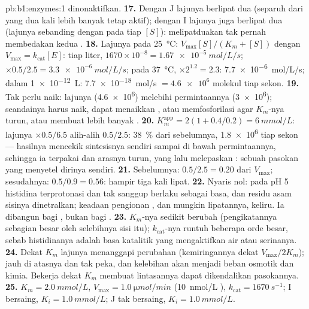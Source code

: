 \begin{solution}{pb:b1:enzymes:1}
dinonaktifkan.
\textbf{17.} Dengan J lajunya berlipat dua (separuh dari  yang dua
kali lebih banyak tetap aktif); dengan I lajunya juga berlipat dua
(lajunya sebanding dengan  pada tiap $[S]$): melipatduakan
 tak pernah membedakan kedua .
\textbf{18.} Lajunya pada \qty{25}{\celsius}: $V_{\max}[S]/(K_m + [S])$
dengan $V_{\max} = k_{\text{cat}}[E]$: tiap liter, $1670\times 10^{-8} =
\qty{1.67e-5}{mol/L/s}$; $\times 0.5/2.5 = \qty{3.3e-6}{mol/L/s}$; pada
\qty{37}{\celsius}, $\times 2^{1.2} = 2.3$: \qty{7.7e-6}{mol/L/s}; dalam
\qty{1e-12}{L}: \qty{7.7e-18}{mol/s} $= \num{4.6e6}$ molekul tiap sekon.
\textbf{19.} Tak perlu naik: lajunya (\num{4.6e6}) melebihi
permintaannya (\num{3e6}); seandainya harus naik,  dapat menaikkan
, atau memfosforilasi  agar $K_m$-nya turun, atau
membuat lebih banyak .
\textbf{20.} $K_m^{\text{app}} = 2(1 + 0.4/0.2) = \qty{6}{mmol/L}$:
lajunya $\times 0.5/6.5$ alih-alih $0.5/2.5$: \qty{38}{\%} dari
sebelumnya, \num{1.8e6} tiap sekon --- hasilnya mencekik sintesisnya
sendiri sampai di bawah permintaannya, sehingga ia terpakai dan arasnya
turun, yang lalu melepaskan : sebuah pasokan yang menyetel
dirinya sendiri.
\textbf{21.} Sebelumnya: $0.5/2.5 = 0.20$ dari $V_{\max}$; sesudahnya:
$0.5/0.9 =
0.56$: hampir tiga kali lipat.
\textbf{22.} Nyaris nol: pada pH 5 histidina  terprotonasi
dan tak sanggup berlaku sebagai basa, dan residu asam sisinya
dinetralkan; keadaan pengionan , dan mungkin lipatannya,
keliru. Ia dibangun bagi , bukan bagi .
\textbf{23.} $K_m$-nya sedikit berubah (pengikatannya sebagian besar
oleh selebihnya sisi itu); $k_{\text{cat}}$-nya runtuh beberapa orde
besar, sebab histidinanya adalah basa katalitik yang mengaktifkan air
atau serinanya.
\textbf{24.} Dekat $K_m$ lajunya menanggapi perubahan 
(kemiringannya dekat $V_{\max}/2K_m$); jauh di atasnya  
dan tak peka, dan kelebihan  akan menjadi beban osmotik dan
kimia. Bekerja dekat $K_m$ membuat lintasannya dapat dikendalikan
pasokannya.
\textbf{25.} $K_m = \qty{2.0}{mmol/L}$, $V_{\max} = \qty{1.0}{\micro mol/min}$
(\qty{10}{nmol/L} ), $k_{\text{cat}} = \qty{1670}{s^{-1}}$; I
bersaing, $K_i = \qty{1.0}{mmol/L}$; J tak bersaing, $K_i =
\qty{1.0}{mmol/L}$.
\end{solution}
